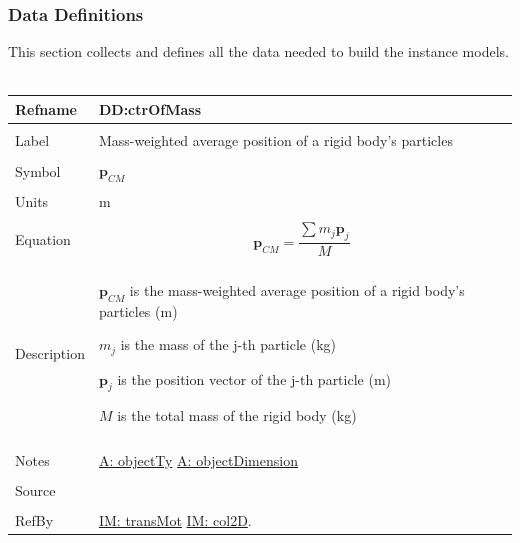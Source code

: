 \documentclass[12pt]{article}
\begin{document}
\subsubsection{Data Definitions}
\label{Sec:DDs}
This section collects and defines all the data needed to build the instance models.
~\newline
\noindent \begin{minipage}{\textwidth}
\begin{tabular}{p{} p{}}
\toprule \textbf{Refname} & \textbf{DD:ctrOfMass}
\label{DD:ctrOfMass}
\\ \midrule \\
Label & Mass-weighted average position of a rigid body's particles
\\ \midrule \\
Symbol & ${\mathbf{p}_{CM}}$
\\ \midrule \\
Units & m
\\ \midrule \\
Equation & \begin{dmath}
           {\mathbf{p}_{CM}}=\frac{\displaystyle\sum{{m_{j}} {\mathbf{p}_{j}}}}{M}
           \end{dmath}
\\ \midrule \\
Description & \begin{symbDescription}
              \item{${\mathbf{p}_{CM}}$ is the mass-weighted average position of a rigid body's particles (m)}
              \item{${m_{j}}$ is the mass of the j-th particle (kg)}
              \item{${\mathbf{p}_{j}}$ is the position vector of the j-th particle (m)}
              \item{$M$ is the total mass of the rigid body (kg)}
              \end{symbDescription}
\\ \midrule \\
Notes & \hyperref[A:objectTy]{A: objectTy}
        \hyperref[A:objectDimension]{A: objectDimension}
\\ \midrule \\
Source & 
\\ \midrule \\
RefBy & \hyperref[IM:transMot]{IM: transMot} \hyperref[IM:col2D]{IM: col2D}.
\\ \bottomrule \end{tabular}
\end{minipage}\\
\end{document}
